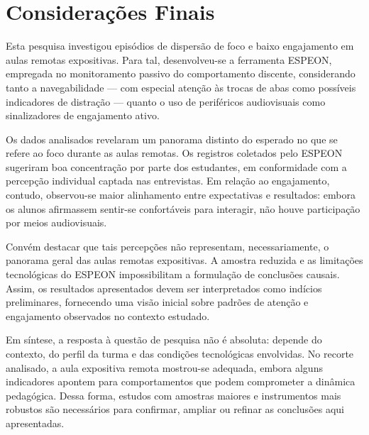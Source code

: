 \chapter{Considerações Finais}\label{chp:final_considerations}

Esta pesquisa investigou episódios de dispersão de foco e baixo engajamento em aulas remotas expositivas. Para tal, desenvolveu-se a ferramenta ESPEON, empregada no monitoramento passivo do comportamento discente, considerando tanto a navegabilidade — com especial atenção às trocas de abas como possíveis indicadores de distração — quanto o uso de periféricos audiovisuais como sinalizadores de engajamento ativo.

Os dados analisados revelaram um panorama distinto do esperado no que se refere ao foco durante as aulas remotas. Os registros coletados pelo ESPEON sugeriram boa concentração por parte dos estudantes, em conformidade com a percepção individual captada nas entrevistas. Em relação ao engajamento, contudo, observou-se maior alinhamento entre expectativas e resultados: embora os alunos afirmassem sentir-se confortáveis para interagir, não houve participação por meios audiovisuais.

Convém destacar que tais percepções não representam, necessariamente, o panorama geral das aulas remotas expositivas. A amostra reduzida e as limitações tecnológicas do ESPEON impossibilitam a formulação de conclusões causais. Assim, os resultados apresentados devem ser interpretados como indícios preliminares, fornecendo uma visão inicial sobre padrões de atenção e engajamento observados no contexto estudado.

Em síntese, a resposta à questão de pesquisa não é absoluta: depende do contexto, do perfil da turma e das condições tecnológicas envolvidas. No recorte analisado, a aula expositiva remota mostrou-se adequada, embora alguns indicadores apontem para comportamentos que podem comprometer a dinâmica pedagógica. Dessa forma, estudos com amostras maiores e instrumentos mais robustos são necessários para confirmar, ampliar ou refinar as conclusões aqui apresentadas.


